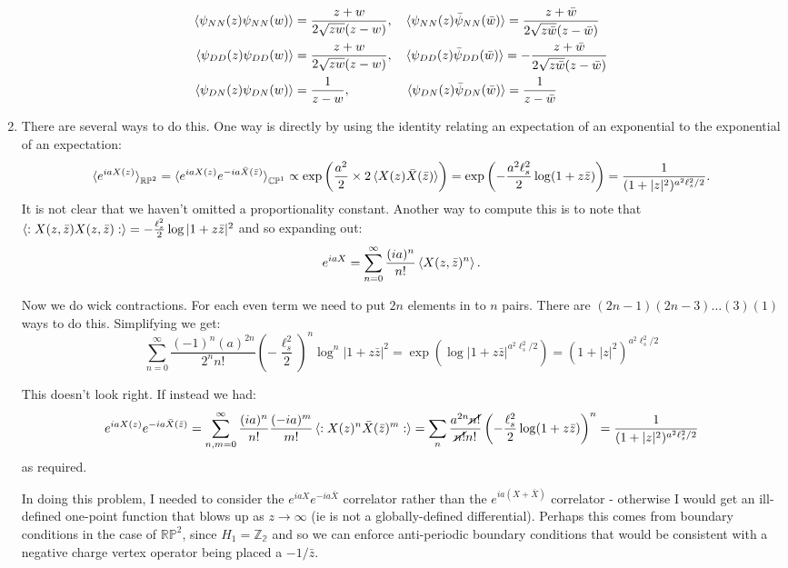 \documentclass[11pt]{article}
\begin{document}
\begin{enumerate}
	\[
	\begin{aligned}
		\braket{\psi_{NN}(z) \psi_{NN} (w)} &= \frac{z+w}{2 \sqrt{z w} (z - w)}, \quad 
		\braket{\psi_{NN}(z) \bar \psi_{NN} (\bar w)} = \frac{z+\bar w}{2 \sqrt{z \bar w} (z - \bar w)} \\
		\braket{\psi_{DD}(z) \psi_{DD} (w)} &= \frac{z+w}{2 \sqrt{z w} (z - w)}, \quad 
		\braket{\psi_{DD}(z) \bar \psi_{DD} (\bar w)} = -\frac{z+\bar w}{2 \sqrt{z \bar w} (z - \bar w)} \\
		\braket{\psi_{DN}(z) \psi_{DN} (w)} &= \frac{1}{z-w}, \;\, \qquad \qquad 
		\braket{\psi_{DN}(z) \bar \psi_{DN} (\bar w)} = \frac{1}{z-\bar w}\\
	\end{aligned}
	\]
	\item There are several ways to do this. One way is directly by using the identity relating an expectation of an exponential to the exponential of an expectation:
	\[
		\braket{e^{i a X(z)}}_{\mathbb{RP}^2} = \braket{e^{i a X(z) } e^{-i a \bar X(\bar z)}}_{\mathbb{CP}^1} \propto \exp\left(\frac{a^2}{2} \times 2 \braket{X(z) \bar X(\bar z)}\right) = \exp\left(-\frac{a^2 \ell_s^2}{2} \log(1 + z \bar z)\right) = \frac{1}{(1+|z|^2)^{a^2 \ell_s^2/2}}.
	\]
	It is not clear that we haven't omitted a proportionality constant. Another way to compute this is to note that $\braket{:X(z, \bar z) X(z, \bar z):} = - \frac{\ell_s^2}{2} \log|1 + z \bar z|^2$ and so expanding out:
	\[
		e^{i a X} = \sum_{n=0}^\infty \frac{(ia)^n}{n!} \braket{X(z, \bar z)^n}.
	\]
	
	Now we do wick contractions. For each even term we need to put $2n$ elements in to $n$ pairs. There are $(2n-1)(2n-3) \dots (3) (1)$ ways to do this. Simplifying we get:
	\[
		\sum_{n=0}^\infty \frac{(-1)^n (a)^{2n}}{2^n n!} \left(-\frac{\ell_s^2}{2}\right)^{n} \log^n |1+z \bar z|^2 = \exp\left(\log|1+z \bar z|^{a^2 \ell_s^2/2} \right) = (1 + |z|^2)^{a^2 \ell_s^2/2}
	\]
	
	This doesn't look right. If instead we had:
	\[
		e^{i a X(z)} e^{-i a \bar X(\bar z)} = \sum_{n,m=0}^\infty \frac{(i a)^n}{n!}  \frac{(-i a)^m}{m!} \braket{:X(z)^n \bar X(\bar z)^m:} = \sum_n \frac{a^{2n} \cancel{n!}}{\cancel{n!} n!} \left(-\frac{\ell_s^2}{2} \log(1 + z \bar z) \right)^n = \frac{1}{(1 + |z|^2)^{a^2 \ell_s^2/2}}
	\]
	as required. 
	
	In doing this problem, I needed to consider the $e^{i a X} e^{-i a \bar X}$ correlator rather than the $e^{i a (X + \bar X)}$ correlator - otherwise I would get an ill-defined one-point function that blows up as $z \to \infty$ (ie is not a globally-defined differential). Perhaps this comes from boundary conditions in the case of $\mathbb{RP}^2$, since $H_1 = \mathbb{Z_2}$ and so we can enforce anti-periodic boundary conditions that would be consistent with a negative charge vertex operator being placed a $-1/\bar z$. 
	

\end{enumerate}
\end{document}
